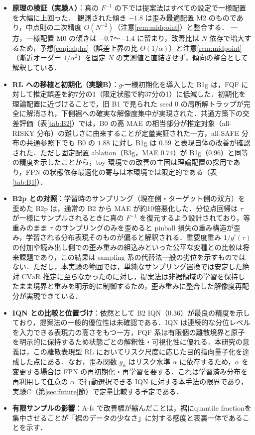 \documentclass[a4paper,10pt]{jsarticle}
\theoremstyle{definition}
\newcommand{\CVaR}{\mathrm{CVaR}}
\newcommand{\Finv}{F^{-1}}
\begin{document}
\begin{itemize}
  \item \textbf{原理の検証（実験A）}：真の $\Finv$ の下では提案法はすべての設定で一様配置を大幅に上回った．
  観測された傾き $-1.8$ は歪み最適配置 M2 のものであり，中点則の二次精度 $O(N^{-2})$（注意\ref{rem:midpoint}）と整合する．
  一方，一様配置 M0 の傾きは $-0.7$〜$-1.4$ に留まり，改善比は $N$ 依存で増大するため，予想\ref{conj:alpha}（誤差上界の比 $\Theta(1/\alpha)$）と注意\ref{rem:midpoint}（漸近オーダー $1/\alpha^2$）を固定 $N$ の実測値と直結させず，傾向の整合として解釈している．
  \item \textbf{RL への移植と初期化（実験B）}：$g$-一様初期化を導入した B1g は，FQF に対して推定誤差を約7分の1（限定状態で約37分の1）に低減した．初期化を理論配置に近づけることで，旧 B1 で見られた seed 0 の局所解トラップが完全に解消され，下側裾への確実な解像度集中が実現された．共通方策下の交差評価（表\ref{tab:B2}）では，B0 の高 MAE の相当部分が推定対象（all-RISKY 分布）の難しさに由来することが定量実証された一方，all-SAFE 分布の共通参照下でも B0 の $1.88$ に対し B1g は $0.59$ と表現自体の改善が確認された．ただし固定配置 ablation（B3g，MAE $0.74$）が B1g（$0.96$）と同等の精度を示したことから，toy 環境での改善の主因は理論配置の採用であり，FPN の状態依存最適化の寄与は本環境では限定的である（表\ref{tab:B1}）．
  \item \textbf{B2p との対照}：学習時のサンプリング（現在側・ターゲット側の双方）を歪めた B2p は，通常の B2 から MAE が約10倍悪化した．分位点回帰は $\tau$ が一様にサンプルされるときに真の $\Finv$ を復元するよう設計されており，等重みのまま $\tau$ のサンプリングのみを歪めると pinball 損失の重み構造が歪み，学習される分布表現そのものが偏ると解釈される．重要度重み $1/g'(\tau)$ の付加や読み出し側での歪み重みの組込みといった公平な変種との比較は将来課題であり，この結果は sampling 系の代替法一般の劣位を示すものではない．ただし，本実験の範囲では，単純なサンプリング置換では安定した絶対 $\CVaR$ 推定に至らなかったのに対し，提案法は非裾領域の学習を保持したまま境界と重みを明示的に制御するため，歪み重みに整合した解像度再配分が実現できている．
  \item \textbf{IQN との比較と位置づけ}：依然として B2 IQN（0.36）が最良の精度を示しており，提案法の一般的優位性は未確認である．IQN は連続的な分位レベルを入力できる表現力の高さをもつ一方，FQF 系は有限個の離散境界と原子を明示的に保持するため状態ごとの解釈性・可視化性に優れる．本研究の意義は，この離散表現型 RL においてリスク尺度に応じた目的指向量子化を達成した点にある．なお，歪み関数 $g_\alpha$ はリスク水準 $\alpha$ に依存するため，$\alpha$ を変更する場合は FPN の再初期化・再学習を要する．これは学習済み分布を再利用して任意の $\alpha$ で行動選択できる IQN に対する本手法の限界であり，実験C（第\ref{sec:future}節）で定量比較する予定である．
  \item \textbf{有限サンプルの影響}：A-fs で改善幅が縮んだことは，裾にquantile fractionを集中させることが「裾のデータの少なさ」に対する感度と表裏一体であることを示す．
\end{itemize}
\end{document}
